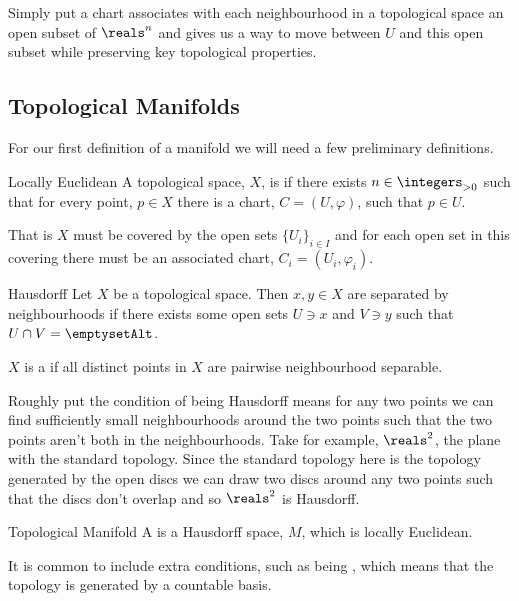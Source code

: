 \documentclass[fleqn]{NotesClass}
\begin{document}
    Simply put a chart associates with each neighbourhood in a topological space an open subset of \(\reals^n\) and gives us a way to move between \(U\) and this open subset while preserving key topological properties.
    
    \subsection{Topological Manifolds}
    For our first definition of a manifold we will need a few preliminary definitions.
    \begin{dfn}{Locally Euclidean}{}
        A topological space, \(X\), is  if there exists \(n \in \integers_{>0}\) such that for every point, \(p \in X\) there is a chart, \(C = (U, \varphi)\), such that \(p \in U\).
    \end{dfn}
    
    That is \(X\) must be covered by the open sets \(\{U_i\}_{i\in I}\) and for each open set in this covering there must be an associated chart, \(C_i = (U_i, \varphi_i)\).

    \begin{dfn}{Hausdorff}{}
        Let \(X\) be a topological space.
        Then \(x, y \in X\) are separated by neighbourhoods if there exists some open sets \(U \ni x\) and \(V \ni y\) such that \(U \cap V = \emptysetAlt\).
        
        \(X\) is a  if all distinct points in \(X\) are pairwise neighbourhood separable.
    \end{dfn}
    Roughly put the condition of being Hausdorff means for any two points we can find sufficiently small neighbourhoods around the two points such that the two points aren't both in the neighbourhoods.
    Take for example, \(\reals^2\), the plane with the standard topology.
    Since the standard topology here is the topology generated by the open discs we can draw two discs around any two points such that the discs don't overlap and so \(\reals^2\) is Hausdorff.
    
    \begin{dfn}{Topological Manifold}{}
        A  is a Hausdorff space, \(M\), which is locally Euclidean.
    \end{dfn}
    
    It is common to include extra conditions, such as being , which means that the topology is generated by a countable basis.
\end{document}
